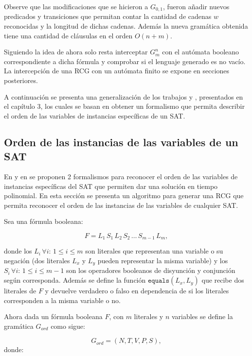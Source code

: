 Observe que las modificaciones que se hicieron a $G_{0,1}$, fueron añadir nuevos predicados y transiciones que permitan
contar la cantidad de cadenas $w$ reconocidas y la longitud de dichas cadenas. Además la nueva gramática obtenida
tiene una cantidad de cláusulas en el orden $O(n+m)$.

Siguiendo la idea de \cite{aSMSAT} ahora solo resta interceptar $G^n_m$ con el autómata booleano correspondiente a dicha
fórmula y comprobar si el lenguaje generado es no vacío. La intercepción de una RCG con un autómata finito se expone en secciones posteriores.

A continuación se presenta una generalización de los trabajos \cite{aCFSAT} y \cite{aSRCSAT}, presentados en el capítulo 3, los cuales
se basan en obtener un formalismo que permita describir el orden de las variables de instancias específicas de un SAT.

\subsection{Orden de las instancias de las variables de un SAT}

En \cite{aCFSAT} y en \cite{aSRCSAT} se proponen 2 formalismos para reconocer el orden de las variables de instancias específicas del SAT que permiten dar una solución en tiempo polinomial. En esta sección se presenta un algoritmo para generar una RCG que permita reconocer el orden de las instancias de las variables de cualquier SAT.

Sea una fórmula booleana:

$$F=L_1\,S_1\,L_2\,S_2\,\ldots\,S_{m-1}\,L_m,$$

donde los $L_i\,\forall i:\,1\leq i\leq m$ son literales que representan una variable o su negación (dos literales
$L_x$ y $L_y$ pueden representar la misma variable) y los $S_i\,\forall i:\,1\leq i\leq m-1$ son los operadores
booleanos de disyunción y conjunción según corresponda. Además se define la función $\texttt{equals}(L_x,L_y)$
que recibe dos literales de $F$ y devuelve verdadero o falso en dependencia de si los literales corresponden
a la misma variable o no.

Ahora dada un fórmula booleana $F$, con $m$ literales y $n$ variables se define la gramática $G_{ord}$
como sigue:

\[
    G_{ord} = (N, T, V, P, S),
\]
donde:

